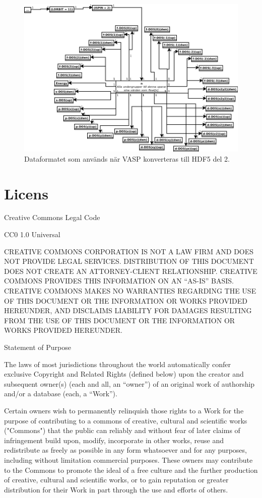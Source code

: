 \documentclass[a4paper,12pt]{article}
\begin{document}
\begin{appendices}
\begin{figure}[H]
    \centering
    \includegraphics[scale=0.50,angle=-90,origin=c]{hdf5-dataformat3del2.png}
    \caption{Dataformatet som används när VASP konverteras till HDF5 del 2.}
\end{figure}



\newpage
\section{Licens}
\label{ref:licens}
 Creative Commons Legal Code

CC0 1.0 Universal

    CREATIVE COMMONS CORPORATION IS NOT A LAW FIRM AND DOES NOT PROVIDE
    LEGAL SERVICES. DISTRIBUTION OF THIS DOCUMENT DOES NOT CREATE AN
    ATTORNEY-CLIENT RELATIONSHIP. CREATIVE COMMONS PROVIDES THIS
    INFORMATION ON AN ``AS-IS'' BASIS. CREATIVE COMMONS MAKES NO WARRANTIES
    REGARDING THE USE OF THIS DOCUMENT OR THE INFORMATION OR WORKS
    PROVIDED HEREUNDER, AND DISCLAIMS LIABILITY FOR DAMAGES RESULTING FROM
    THE USE OF THIS DOCUMENT OR THE INFORMATION OR WORKS PROVIDED
    HEREUNDER.

Statement of Purpose

The laws of most jurisdictions throughout the world automatically confer
exclusive Copyright and Related Rights (defined below) upon the creator
and subsequent owner(s) (each and all, an ``owner'') of an original work of
authorship and/or a database (each, a ``Work'').

Certain owners wish to permanently relinquish those rights to a Work for
the purpose of contributing to a commons of creative, cultural and
scientific works ("Commons") that the public can reliably and without fear
of later claims of infringement build upon, modify, incorporate in other
works, reuse and redistribute as freely as possible in any form whatsoever
and for any purposes, including without limitation commercial purposes.
These owners may contribute to the Commons to promote the ideal of a free
culture and the further production of creative, cultural and scientific
works, or to gain reputation or greater distribution for their Work in
part through the use and efforts of others.


\end{appendices}
\end{document}
